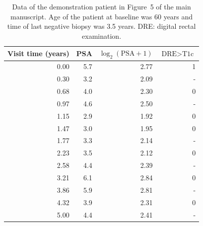 \begin{table}[!htb]
\begin{center}
\caption{Data of the demonstration patient in Figure~5 of the main manuscript. Age of the patient at baseline was 60 years and time of last negative biopsy was 3.5 years. DRE: digital rectal examination.}
\label{tab:demo_patient}
\begin{tabular}{rrrr}
\hline
Visit time (years) & PSA & $\log_2(\mbox{PSA}+1)$ & $\mbox{DRE} > \mbox{T1c}$\\ 
\hline
0.00 & 5.7 & 2.77 &            1\\
0.30 & 3.2 & 2.09 &           -\\
0.68 & 4.0 & 2.30 &            0\\
0.97 & 4.6 & 2.50 &           -\\
1.15 & 2.9 & 1.92 &            0\\
1.47 & 3.0 & 1.95 &            0\\
1.77 & 3.3 & 2.14 &           -\\
2.23 & 3.5 & 2.12 &            0\\
2.58 & 4.4 & 2.39 &           -\\
3.21 & 6.1 & 2.84 &            0\\
3.86 & 5.9 & 2.81 &           -\\
4.32 & 3.9 & 2.31 &            0\\
5.00 & 4.4 & 2.41 &           -\\
\hline
\end{tabular}   
\end{center}
\end{table}


